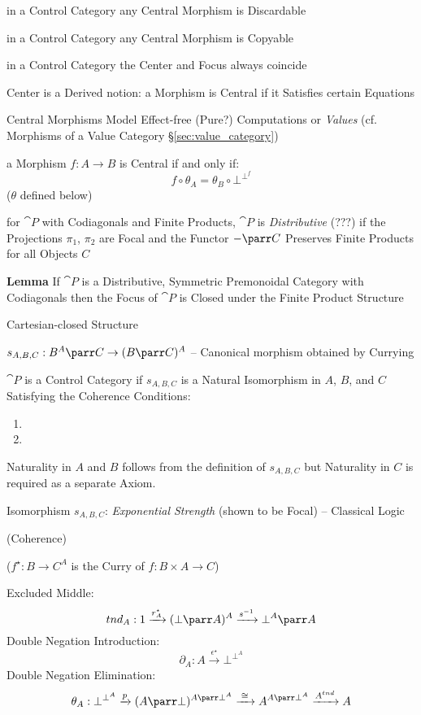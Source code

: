 in a Control Category any Central Morphism is Discardable

in a Control Category any Central Morphism is Copyable

in a Control Category the Center and Focus always coincide

Center is a Derived notion: a Morphism is Central if it Satisfies
certain Equations

Central Morphisms Model Effect-free (Pure?) Computations or
\emph{Values} (cf. Morphisms of a Value Category
\S\ref{sec:value_category})

a Morphism $f : A \rightarrow B$ is Central if and only if:
\[
  f \circ \theta_A = \theta_B \circ \bot^{\bot^f}
\]
($\theta$ defined below)

for $\cat{P}$ with Codiagonals and Finite Products, $\cat{P}$ is
\emph{Distributive} (???) if the Projections $\pi_1$, $\pi_2$ are
Focal and the Functor $-\parr C$ Preserves Finite Products for all
Objects $C$ %

\textbf{Lemma} If $\cat{P}$ is a Distributive, Symmetric Premonoidal
Category with Codiagonals then the Focus of $\cat{P}$ is Closed under
the Finite Product Structure

Cartesian-closed Structure

$s_{A,B,C} : B^A \parr C \rightarrow (B \parr C)^A$ -- Canonical
morphism obtained by Currying %

$\cat{P}$ is a Control Category if $s_{A,B,C}$ is a Natural
Isomorphism in $A$, $B$, and $C$ Satisfying the Coherence Conditions:
\begin{enumerate}
  \item
  \item
\end{enumerate}

\fist Naturality in $A$ and $B$ follows from the definition of
$s_{A,B,C}$ but Naturality in $C$ is required as a separate Axiom.

Isomorphism $s_{A,B,C}$: \emph{Exponential Strength} (shown to be
Focal) -- Classical Logic

(Coherence) %

($f^\star : B \rightarrow C^A$ is the Curry of $f : B \times A
\rightarrow C$)

Excluded Middle:
\[
  tnd_A : 1 \xrightarrow{r^\star_A} (\bot \parr A)^A
  \xrightarrow{s^{-1}} \bot^A \parr A
\]
Double Negation Introduction:
\[
  \partial_A : A \xrightarrow{\epsilon^\star} \bot^{\bot^A}
\]
Double Negation Elimination:
\[
  \theta_A : \bot^{\bot^A} \xrightarrow{p} (A \parr
  \bot)^{A\parr\bot^A} \xrightarrow{\;\cong\;} A^{A\parr\bot^A}
  \xrightarrow{A^{tnd}} A
\]

